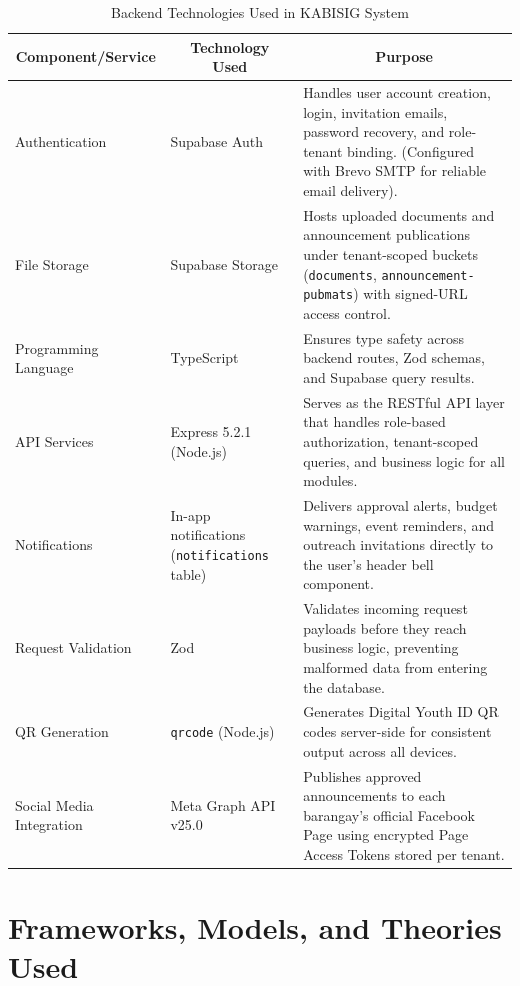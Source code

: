 \begin{table}[H]
\centering
\caption{Backend Technologies Used in KABISIG System}
\label{tab:backend_technologies_used}
\begin{tabular}{|l|p{3.5cm}|p{6.5cm}|}
\hline
\multicolumn{1}{|c|}{\textbf{Component/Service}} & \multicolumn{1}{c|}{\textbf{Technology Used}} & \multicolumn{1}{c|}{\textbf{Purpose}} \\ \hline
Authentication & Supabase Auth & Handles user account creation, login, invitation emails, password recovery, and role-tenant binding. (Configured with Brevo SMTP for reliable email delivery). \\ \hline
File Storage & Supabase Storage & Hosts uploaded documents and announcement publications under tenant-scoped buckets (\texttt{documents}, \texttt{announcement-pubmats}) with signed-URL access control. \\ \hline
Programming Language & TypeScript & Ensures type safety across backend routes, Zod schemas, and Supabase query results. \\ \hline
API Services & Express 5.2.1 (Node.js) & Serves as the RESTful API layer that handles role-based authorization, tenant-scoped queries, and business logic for all modules. \\ \hline
Notifications & In-app notifications (\texttt{notifications} table) & Delivers approval alerts, budget warnings, event reminders, and outreach invitations directly to the user's header bell component. \\ \hline
Request Validation & Zod & Validates incoming request payloads before they reach business logic, preventing malformed data from entering the database. \\ \hline
QR Generation & \texttt{qrcode} (Node.js) & Generates Digital Youth ID QR codes server-side for consistent output across all devices. \\ \hline
Social Media Integration & Meta Graph API v25.0 & Publishes approved announcements to each barangay's official Facebook Page using encrypted Page Access Tokens stored per tenant. \\ \hline
\end{tabular}
\end{table}
\vspace{5mm}

\section{Frameworks, Models, and Theories Used}
\label{sec:frameworks_models_and_theories_used}

